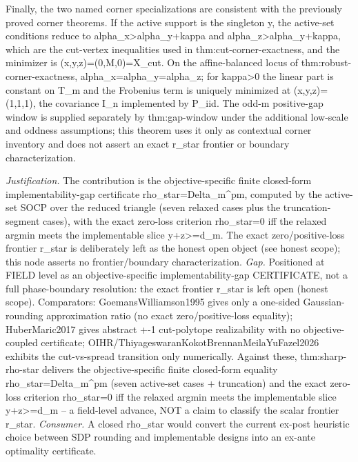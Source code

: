 \documentclass{article}
\begin{document}
Finally, the two named corner specializations are consistent with the previously proved corner theorems. If the active support is the singleton {y}, the active-set conditions reduce to alpha_x>alpha_y+kappa and alpha_z>alpha_y+kappa, which are the cut-vertex inequalities used in thm:cut-corner-exactness, and the minimizer is (x,y,z)=(0,M,0)=X_cut. On the affine-balanced locus of thm:robust-corner-exactness, alpha_x=alpha_y=alpha_z; for kappa>0 the linear part is constant on T_m and the Frobenius term is uniquely minimized at (x,y,z)=(1,1,1), the covariance I_n implemented by P_iid. The odd-m positive-gap window is supplied separately by thm:gap-window under the additional low-scale and oddness assumptions; this theorem uses it only as contextual corner inventory and does not assert an exact r_star frontier or boundary characterization.
\par\smallskip\noindent \textit{Justification.} The contribution is the objective-specific finite closed-form implementability-gap certificate rho_star=Delta_m^pm, computed by the active-set SOCP over the reduced triangle (seven relaxed cases plus the truncation-segment cases), with the exact zero-loss criterion rho_star=0 iff the relaxed argmin meets the implementable slice y+z>=d_m. The exact zero/positive-loss frontier r_star is deliberately left as the honest open object (see honest scope); this node asserts no frontier/boundary characterization. \textit{Gap.} Positioned at FIELD level as an objective-specific implementability-gap CERTIFICATE, not a full phase-boundary resolution: the exact frontier r_star is left open (honest scope). Comparators: GoemansWilliamson1995 gives only a one-sided Gaussian-rounding approximation ratio (no exact zero/positive-loss equality); HuberMaric2017 gives abstract +-1 cut-polytope realizability with no objective-coupled certificate; OIHR/ThiyageswaranKokotBrennanMeilaYuFazel2026 exhibits the cut-vs-spread transition only numerically. Against these, thm:sharp-rho-star delivers the objective-specific finite closed-form equality rho_star=Delta_m^pm (seven active-set cases + truncation) and the exact zero-loss criterion rho_star=0 iff the relaxed argmin meets the implementable slice y+z>=d_m -- a field-level advance, NOT a claim to classify the scalar frontier r_star. \textit{Consumer.} A closed rho_star would convert the current ex-post heuristic choice between SDP rounding and implementable designs into an ex-ante optimality certificate.
\end{document}
